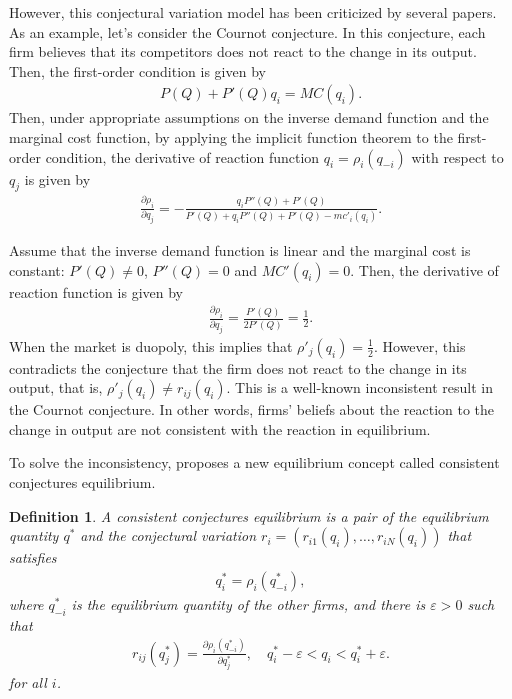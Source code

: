 \documentclass[11pt, a4paper]{article}
\newtheorem{definition}{Definition}
\theoremstyle{remark}
\begin{document}
However, this conjectural variation model has been criticized by several papers.
As an example, let's consider the Cournot conjecture.
In this conjecture, each firm believes that its competitors does not react to the change in its output.
Then, the first-order condition is given by
\begin{align}
    P(Q) + P'(Q)q_i = MC(q_i).
\end{align}
Then, under appropriate assumptions on the inverse demand function and the marginal cost function, by applying the implicit function theorem to the first-order condition, the derivative of reaction function $q_i = \rho_i(q_{-i})$ with respect to $q_j$ is given by
\begin{align}
    \frac{\partial \rho_i}{\partial q_j} = -\frac{q_iP''(Q) + P'(Q)}{P'(Q) + q_iP''(Q)+ P'(Q) - mc'_i(q_i)}.
\end{align}

Assume that the inverse demand function is linear and the marginal cost is constant: 
$P'(Q) \ne 0$, $P''(Q) = 0$ and $MC'(q_i) = 0$.
Then, the derivative of reaction function is given by
\begin{align}
    \frac{\partial \rho_i}{\partial q_j} = \frac{P'(Q)}{2P'(Q)} = \frac{1}{2}.
\end{align}
When the market is duopoly, this implies that $\rho'_{j}(q_i) = \frac{1}{2}$.
However, this contradicts the conjecture that the firm does not react to the change in its output, that is, $\rho'_{j}(q_i) \ne r_{ij}(q_i)$.
This is a well-known inconsistent result in the Cournot conjecture.
In other words, firms' beliefs about the reaction to the change in output are not consistent with the reaction in equilibrium.

To solve the inconsistency, proposes a new equilibrium concept called consistent conjectures equilibrium.


\begin{framed}
    \begin{definition}
        A consistent conjectures equilibrium is a pair of the equilibrium quantity $q^*$ and the conjectural variation $r_i = (r_{i1}(q_i), \ldots, r_{iN}(q_i))$ that satisfies 
        \begin{align}
            q^*_i = \rho_i(q_{-i}^*),
        \end{align}
        where $q_{-i}^*$ is the equilibrium quantity of the other firms, and there is $\varepsilon > 0$ such that
        \begin{align}
            r_{ij}(q_j^*) = \frac{\partial \rho_{i}(q_{-i}^*)}{\partial q_j^*},\quad q^*_{i} - \varepsilon < q_i < q^*_{i} + \varepsilon.
        \end{align}
        for all $i$.
    \end{definition}
\end{framed}
\end{document}
